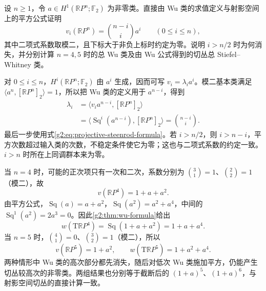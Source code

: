 \begin{exercise}\label{g2:ex:real-projective-wu-formula-all-dimensions}
	设 \(n\ge1\)，令 \(a\in H^1(\mathbb RP^n;\mathbb F_2)\) 为非零类。直接由 Wu 类的求值定义与射影空间上的平方公式证明
	\[
		v_i(\mathbb RP^n)=\binom{n-i}{i}a^i\qquad(0\le i\le n),
	\]
	其中二项式系数取模二，且下标大于非负上标时约定为零。说明 \(i>n/2\) 时为何消失，并分别计算 \(n=4,5\) 时的总 Wu 类及由 Wu 公式得到的切丛总 Stiefel--Whitney 类。
\end{exercise}
\begin{solution}
	对 \(0\le i\le n\)，\(H^i(\mathbb RP^n;\mathbb F_2)\) 由 \(a^i\) 生成，因而可写 \(v_i=\lambda_i a^i\)。模二基本类满足 \(\langle a^n,[\mathbb RP^n]_2\rangle=1\)，所以把 Wu 类的定义用于 \(a^{n-i}\)，得到
	\[
	\begin{aligned}
		\lambda_i
		&=\langle v_i a^{n-i},[\mathbb RP^n]_2\rangle\\
		&=\langle\operatorname{Sq}^i(a^{n-i}),[\mathbb RP^n]_2\rangle
		=\binom{n-i}{i}.
	\end{aligned}
	\]
	最后一步使用式\eqref{g2:eq:projective-steenrod-formula}。若 \(i>n/2\)，则 \(i>n-i\)，平方次数超过输入类的次数，不稳定条件使它为零；这也与二项式系数的约定一致。\(i>n\) 时所在上同调群本来为零。

	当 \(n=4\) 时，可能的正次项只有一次和二次，系数分别为 \(\binom31=1\)、\(\binom22=1\)（模二），故
	\[
		v(\mathbb RP^4)=1+a+a^2.
	\]
	由平方公式，\(\operatorname{Sq}(a)=a+a^2\)，\(\operatorname{Sq}(a^2)=a^2+a^4\)，中间的 \(\operatorname{Sq}^1(a^2)=2a^3=0\)。因此\cref{g2:thm:wu-formula}给出
	\[
		w(\mathrm T\mathbb RP^4)=\operatorname{Sq}(1+a+a^2)=1+a+a^4.
	\]
	当 \(n=5\) 时，\(\binom41=0\)、\(\binom32=1\)（模二），所以
	\[
		v(\mathbb RP^5)=1+a^2,\qquad
		w(\mathrm T\mathbb RP^5)=1+a^2+a^4.
	\]
	两种情形中 Wu 类的高次部分都先消失，随后对低次 Wu 类施加平方，仍能产生切丛较高次的非零类。两组结果也分别等于截断后的 \((1+a)^5\)、\((1+a)^6\)，与射影空间切丛的直接计算一致。
\end{solution}

